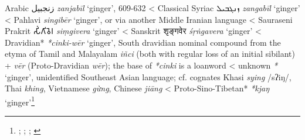 \begin{etymology}\label{ety:zanjabil}
Arabic {زنجبيل} \textit{zanjabīl} `ginger', 609-632
< Classical Syriac {ܙܢܓܒܝܠ‎} \textit{zangabīl} `ginger'
< Pahlavi \textit{singibēr} `ginger', or via another Middle Iranian language
< Sauraseni Prakrit {𑀲𑀺𑀁𑀕𑀺𑀯𑁂𑀭} \textit{siṃgivera} `ginger'
< Sanskrit {शृङ्गवेर} \textit{śṛṅgavera} `ginger'
< Dravidian* \textit{*cinki-wēr} `ginger', South dravidian nominal compound  from the etyma of Tamil and Malayalam \textit{iñci} (both with regular loss of an initial sibilant) + \textit{vēr} (Proto-Dravidian \textit{wēr}); the base of \textit{*cinki} is a loanword
< unknown \textit{*} `ginger', unidentified Southeast Asian language; cf. cognates Khasi \textit{sying} /sʔiŋ/, Thai \textit{khing}, Vietnamese \textit{gừng}, Chinese \textit{jiāng}
< Proto-Sino-Tibetan* \textit{*kjaŋ} `ginger'\footnote{\textcite{cal}; \textcite[90]{ciancaglini_iranian_2008}; \textcite[5]{krishnamurti_dravidian_2003}; \textcite{oed}}
\end{etymology}